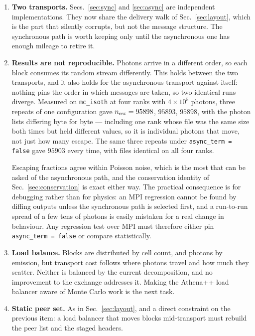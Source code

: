 \documentclass[11pt]{article}
\begin{document}
\begin{enumerate}
\item \textbf{Two transports.} Secs.~\ref{sec:sync} and \ref{sec:async} are independent
implementations. They now share the delivery walk of Sec.~\ref{sec:layout}, which is the
part that silently corrupts, but not the message structure. The synchronous path is worth
keeping only until the asynchronous one has enough mileage to retire it.

\item \textbf{Results are not reproducible.} Photons arrive in a different order, so each
block consumes its random stream differently. This holds between the two transports, and
it also holds for the asynchronous transport against itself: nothing pins the order in
which messages are taken, so two identical runs diverge. Measured on \texttt{mc\_isoth} at
four ranks with $4\times10^{5}$ photons, three repeats of one configuration gave
$n_{\rm esc} = 95898$, $95893$, $95898$, with the photon lists differing byte for byte ---
including one rank whose file was the same size both times but held different values, so
it is individual photons that move, not just how many escape. The same three repeats under
\texttt{async\_term = false} gave $95903$ every time, with files identical on all four
ranks.

Escaping fractions agree within Poisson noise, which is the most that can be asked of the
asynchronous path, and the conservation identity of Sec.~\ref{sec:conservation} is exact
either way. The practical consequence is for debugging rather than for physics: an MPI
regression cannot be found by diffing outputs unless the synchronous path is selected
first, and a run-to-run spread of a few tens of photons is easily mistaken for a real
change in behaviour. Any regression test over MPI must therefore either pin
\texttt{async\_term = false} or compare statistically.

\item \textbf{Load balance.} Blocks are distributed by cell count, and photons by emission,
but transport cost follows where photons travel and how much they scatter. Neither is
balanced by the current decomposition, and no improvement to the exchange addresses it.
Making the Athena++ load balancer aware of Monte Carlo work is the next task.

\item \textbf{Static peer set.} As in Sec.~\ref{sec:layout}, and a direct constraint on the
previous item: a load balancer that moves blocks mid-transport must rebuild the peer list
and the staged headers.
\end{enumerate}
\end{document}
